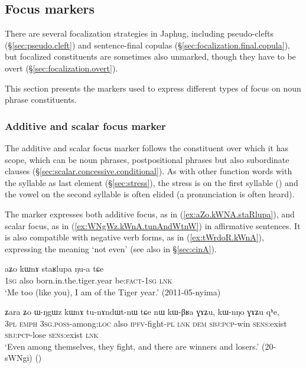  \subsection{Focus markers} \label{sec:focus}
There are several focalization strategies in Japhug, including pseudo-clefts (§\ref{sec:pseudo.cleft}) and sentence-final copulas (§\ref{sec:focalization.final.copula}), but focalized constituents are sometimes also unmarked, though they have to be overt (§\ref{sec:focalization.overt}).

This section presents the markers used to express different types of focus on noun phrase constituents.


 \subsubsection{Additive and scalar focus marker  } \label{sec:kWnA}
The additive and scalar focus marker  follows the constituent over which it has scope, which can be noun phrases, postpositional phrases but also subordinate clauses (§\ref{sec:scalar.concessive.conditional}). As with other function words with the syllable  as last element (§\ref{sec:stress}), the stress is on the first syllable () and the vowel on the second syllable is often elided (a pronunciation  is often heard). 

The marker  expresses both additive focus, as in (\ref{ex:aZo.kWNA.staRlupa}), and scalar focus, as in (\ref{ex:WNgWz.kWnA.tunAndWtnW}) in affirmative sentences. It is also compatible with negative verb forms, as in (\ref{ex:tWrdoR.kWnA}), expressing the meaning `not even' (see also  in §\ref{sec:cinA}).

\begin{exe}
\ex \label{ex:aZo.kWNA.staRlupa}
\gll aʑo kɯnɤ staʁlupa ŋu-a tɕe \\
\textsc{1sg} also born.in.the.tiger.year be:\textsc{fact}-\textsc{1sg} \textsc{lnk} \\
\glt `Me too (like you), I am of the Tiger year.' (2011-05-nyima)
\end{exe}

\begin{exe}
\ex \label{ex:WNgWz.kWnA.tunAndWtnW}
\gll ʑara ʑo ɯ-ŋgɯz kɯnɤ tu-nɤndɯt-nɯ tɕe nɯ kɯ-βʁa ɣɤʑu, kɯ-nŋo ɣɤʑu qʰe, \\
\textsc{3pl} \textsc{emph} \textsc{3sg}.\textsc{poss}-among:\textsc{loc} also \textsc{ipfv}-fight-\textsc{pl} \textsc{lnk} \textsc{dem} \textsc{sbj}:\textsc{pcp}-win \textsc{sens}:exist \textsc{sbj}:\textsc{pcp}-lose  \textsc{sens}:exist \textsc{lnk} \\
\glt `Even among themselves, they fight, and there are winners and losers.' (20-sWNgi)
()
\end{exe}
 
